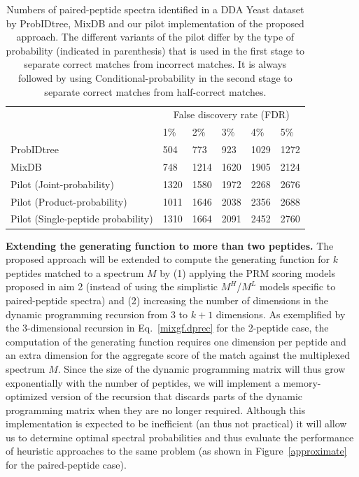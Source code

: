 \documentclass[arial,11pt]{article}
\begin{document}
\begin{table}
  \small
	\begin{center}
	  \begin{tabular}{p{6.5cm}|p{1.2cm}p{1.2cm}p{1.2cm}p{1.2cm}p{1.2cm}} %
			\hline
              & \multicolumn{5}{c}{False discovery rate (FDR)} \\
			      & 1\%  & 2\% & 3\% & 4\% & 5\%  \\
  			\hline
  			\noalign{\smallskip}
  			ProbIDtree & 504  & 773  & 923 & 1029  & 1272 \\
  			MixDB      & 748 & 1214 & 1620 & 1905 & 2124  \\
  			Pilot (Joint-probability)          & 1320 & 1580 & 1972 & 2268 & 2676 \\
  			Pilot (Product-probability)        & 1011 & 1646 & 2038 & 2356 & 2688 \\
			Pilot (Single-peptide probability) & 1310 & 1664 & 2091 & 2452 & 2760\\
			\hline
		\end{tabular}
  \end{center}
	\caption{{\footnotesize Numbers of paired-peptide spectra identified in a DDA Yeast dataset by ProbIDtree, MixDB and our pilot implementation of the proposed approach.  The different variants of the pilot differ by the type of probability (indicated in parenthesis) that is used in the first stage to separate correct matches from incorrect matches.  It is always followed by using Conditional-probability in the second stage to separate correct matches from half-correct matches.} }
	\label{tab:MixGF_ids_compare}
\end{table}

{\bf Extending the generating function to more than two peptides.} The proposed approach will be extended to compute the generating function for $k$ peptides matched to a spectrum $M$ by (1) applying the PRM scoring models proposed in aim 2 (instead of using the simplistic $M^H$/$M^L$ models specific to paired-peptide spectra) and (2) increasing the number of dimensions in the dynamic programming recursion from 3 to $k+1$ dimensions. As exemplified by the 3-dimensional recursion in Eq.~\ref{mixgf.dprec} for the 2-peptide case, the computation of the generating function requires one dimension per peptide and an extra dimension for the aggregate score of the match against the multiplexed spectrum $M$. Since the size of the dynamic programming matrix will thus grow exponentially with the number of peptides, we will implement a memory-optimized version of the recursion that discards parts of the dynamic programming matrix when they are no longer required. Although this implementation is expected to be inefficient (an thus not practical) it will allow us to determine optimal spectral probabilities and thus evaluate the performance of heuristic approaches to the same problem (as shown in Figure~\ref{approximate} for the paired-peptide case).
\end{document}

